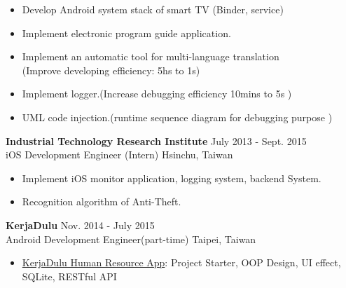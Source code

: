 \documentclass{res}
\begin{document}
\begin{resume}
				\begin{itemize}[leftmargin=*]
					\item Develop Android system stack of smart TV (Binder, service)	
					\vspace{-0.05in}
					\item Implement electronic program guide application.
					\vspace{-0.05in}
					\item Implement an automatic tool for multi-language translation \\(Improve developing efficiency: 5hs to 1s)
					\vspace{-0.05in}		
					\item Implement logger.(Increase debugging efficiency 10mins to 5s )
					\vspace{-0.05in}	
					\item UML code injection.(runtime sequence diagram for debugging purpose )
				\end{itemize}
				\vspace{-0.1in}
				{\bf Industrial Technology Research Institute } {\hfill July 2013 - Sept. 2015}\\	
				iOS Development Engineer (Intern)                        {\hfill Hsinchu, Taiwan}

				\begin{itemize}[leftmargin=*]
					\item Implement iOS monitor application, logging system, backend System.
					\vspace{-0.05in} 
					\item Recognition algorithm of Anti-Theft.
					\vspace{-0.05in}
				\end{itemize}
				\vspace{-0.1in}

	 			{\bf KerjaDulu }                                {\hfill  Nov. 2014 - July 2015}\\
				Android Development Engineer(part-time)			    	 {\hfill Taipei, Taiwan}
		
				\begin{itemize}[leftmargin=*]
					\item {\href{https://play.google.com/store/apps/details?id=com.kerjadulu.kerjadulu&hl=zh_TW}{KerjaDulu Human Resource App}}: Project Starter, OOP Design, UI effect, SQLite, RESTful API
				\end{itemize}
				\vspace{-0.1in}


\end{resume}
\end{document}
